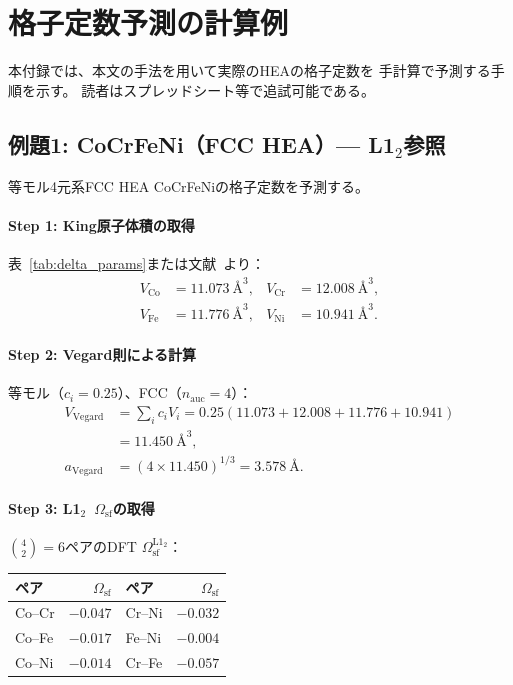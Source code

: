 \documentclass[5p,10pt]{elsarticle}
\begin{document}
\section{格子定数予測の計算例}
\label{sec:appendix_examples}

本付録では、本文の手法を用いて実際のHEAの格子定数を
手計算で予測する手順を示す。
読者はスプレッドシート等で追試可能である。

\subsection{例題1: CoCrFeNi（FCC HEA）--- L1$_2$参照}
\label{sec:example_fcc}

等モル4元系FCC HEA CoCrFeNiの格子定数を予測する。

\paragraph{Step 1: King原子体積の取得}

表~\ref{tab:delta_params}または文献~\cite{King1966}より：
\begin{align*}
V_\text{Co} &= 11.073~\text{\AA}^3, & V_\text{Cr} &= 12.008~\text{\AA}^3, \\
V_\text{Fe} &= 11.776~\text{\AA}^3, & V_\text{Ni} &= 10.941~\text{\AA}^3.
\end{align*}

\paragraph{Step 2: Vegard則による計算}

等モル（$c_i = 0.25$）、FCC（$n_\text{auc} = 4$）：
\begin{align}
V_\text{Vegard} &= \sum_i c_i V_i = 0.25(11.073 + 12.008 + 11.776 + 10.941) \nonumber \\
&= 11.450~\text{\AA}^3, \nonumber \\
a_\text{Vegard} &= (4 \times 11.450)^{1/3} = 3.578~\text{\AA}. \label{eq:ex_vegard_fcc}
\end{align}

\paragraph{Step 3: L1$_2$~$\Omega_\text{sf}$の取得}

$\binom{4}{2} = 6$ペアのDFT $\Omega_\text{sf}^{\text{L1}_2}$：
\begin{center}
\footnotesize
\begin{tabular}{@{}lrlr@{}}
\toprule
ペア & $\Omega_\text{sf}$ & ペア & $\Omega_\text{sf}$ \\
\midrule
Co--Cr & $-0.047$ & Cr--Ni & $-0.032$ \\
Co--Fe & $-0.017$ & Fe--Ni & $-0.004$ \\
Co--Ni & $-0.014$ & Cr--Fe & $-0.057$ \\
\bottomrule
\end{tabular}
\end{center}
\end{document}

